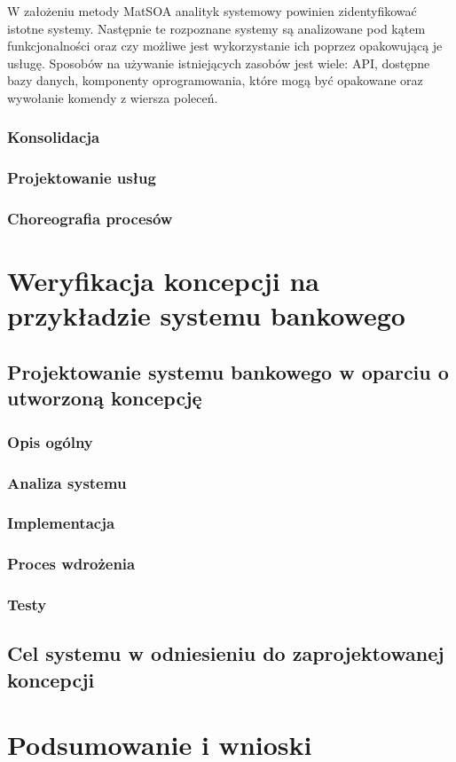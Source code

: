 W założeniu metody MatSOA analityk systemowy powinien zidentyfikować istotne systemy. Następnie te rozpoznane systemy są analizowane pod kątem funkcjonalności oraz czy możliwe jest wykorzystanie ich poprzez opakowującą je usługę. Sposobów na używanie istniejących zasobów jest wiele: API, dostępne bazy danych, komponenty oprogramowania, które mogą być opakowane oraz wywołanie komendy z wiersza poleceń.

\subsection*{Konsolidacja}
\subsection*{Projektowanie usług}
\subsection*{Choreografia procesów}

\chapter{Weryfikacja koncepcji na przykładzie systemu bankowego}


\section{Projektowanie systemu bankowego w oparciu o utworzoną koncepcję}
\subsection{Opis ogólny}
\subsection{Analiza systemu}
\subsection{Implementacja}
\subsection{Proces wdrożenia}
\subsection{Testy}
\section{Cel systemu w odniesieniu do zaprojektowanej koncepcji}
\chapter{Podsumowanie i wnioski}
